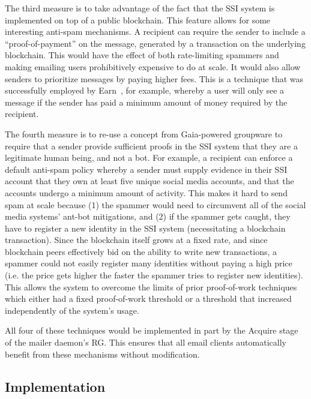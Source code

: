 \hfill \break
{}
\hfill \break

The third measure is to take advantage of the fact that the SSI system is implemented on top of
a public blockchain.  This feature allows for some interesting anti-spam mechanisms.  A recipient can require the sender
to include a ``proof-of-payment'' on the message, generated by a transaction on the
underlying blockchain.  This would have the effect of both rate-limiting
spammers and making emailing users prohibitively expensive to do at scale.  It
would also allow senders to prioritize messages by paying higher fees. This
is a technique that was successfully employed by
Earn~\cite{earn-co}, for example, whereby a user will only see a
message if the sender has paid a minimum amount of money required by the
recipient.

\hfill \break
{}
\hfill \break

The fourth measure is to re-use a concept from Gaia-powered groupware to require
that a sender provide sufficient proofs in the SSI system that they are a
legitimate human being, and not a bot.  For example, a recipient can enforce a
default anti-spam policy whereby a sender must supply evidence in their SSI
account that they own at least five unique social media accounts, and that the
accounts undergo a minimum amount of activity.  This makes it hard to send
spam at scale because (1) the spammer would need to circumvent all of the social
media systems' ant-bot mitigations, and (2) if the spammer gets caught, they
have to register a new identity in the SSI system (necessitating a blockchain
transaction).  Since the blockchain itself grows at a fixed rate, and since
blockchain peers effectively bid on the ability to write new transactions, a
spammer could not easily register many identities without paying a high price
(i.e. the price gets higher the faster the spammer tries to register new
identities).  This allows the system to overcome the limits of prior proof-of-work
techniques~\cite{anti-spam-proof-of-work} which either had a fixed proof-of-work
threshold or a threshold that increased independently of the system's usage.

All four of these techniques would be implemented in part by the Acquire stage of the
mailer daemon's RG.  This ensures that all email clients automatically benefit
from these mechanisms without modification.

\subsection{Implementation}

